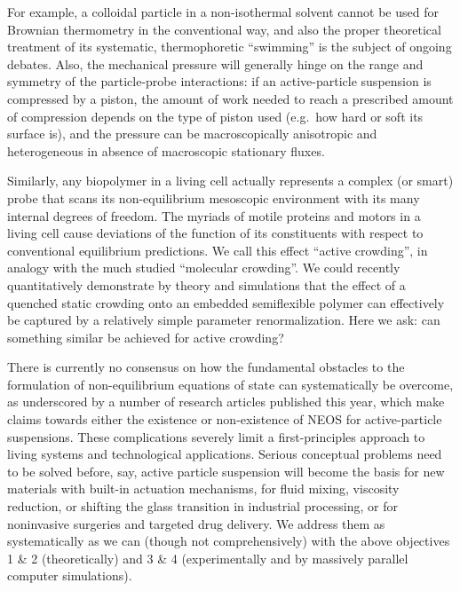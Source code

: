 \begin{workpackage}[id=WP_active,wphases=0-48,
  short=Active Particle Suspensions,%
  title=Probing Active Particle Suspensions with Colloids and Polymers,
  lead=Leipzig,
  LeipzigRM=12]
\begin{wpdescription}
  For example, a colloidal particle in a non-isothermal solvent cannot be used for Brownian thermometry in the conventional way, and also the proper theoretical treatment of its systematic, thermophoretic ``swimming'' is the subject of ongoing debates. 
  Also, the mechanical pressure will generally hinge on the range and symmetry of the particle-probe interactions: if an active-particle suspension is compressed by a piston, the amount of work needed to reach a prescribed amount of compression depends on the type of piston used (e.g.\ how hard or soft its surface is), and the pressure can be macroscopically anisotropic and heterogeneous in absence of macroscopic stationary fluxes. 
  
Similarly, any biopolymer in a living cell actually represents a complex (or smart) probe that scans its non-equilibrium mesoscopic environment with its many internal degrees of freedom. 
  The myriads of motile proteins and motors in a living cell cause deviations of the function of its constituents with respect to conventional equilibrium predictions. 
  We call this effect ``active crowding'', in analogy with the much studied ``molecular crowding''. 
  We could recently quantitatively demonstrate by theory and simulations that the effect of a quenched static crowding onto an embedded semiflexible polymer can effectively be captured by a relatively simple parameter renormalization. 
  Here we ask: can something similar be achieved for active crowding? 

  There is currently no consensus on how the fundamental obstacles to the formulation of non-equilibrium equations of state can systematically be overcome, as underscored by a number of research articles published this year, which make claims towards either the existence or non-existence of NEOS for active-particle suspensions.
  These complications severely limit a first-principles approach to living systems and technological applications. 
 Serious conceptual problems need to be solved before, say, active particle suspension will become the basis for new materials with built-in actuation mechanisms, for fluid mixing, viscosity reduction, or shifting the glass transition in industrial processing, or for noninvasive surgeries and targeted drug delivery. 
  We address them as systematically as we can (though not comprehensively) with the above objectives 1 \& 2 (theoretically) and 3 \& 4 (experimentally and by massively parallel computer simulations). 
 
\end{wpdescription}


\end{workpackage}
